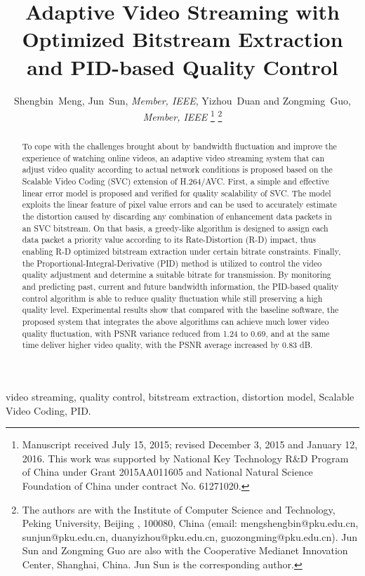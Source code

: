 \documentclass[journal]{IEEEtran}
\title{Adaptive Video Streaming with Optimized Bitstream Extraction and PID-based Quality Control}
\author{Shengbin~Meng, Jun~Sun, {\em Member, IEEE}, Yizhou~Duan and Zongming~Guo, {\em Member, IEEE} %
\thanks{Manuscript received July 15, 2015; revised December 3, 2015 and January 12, 2016. This work was supported by  National Key Technology R\&D Program of China under Grant 2015AA011605 and National Natural Science Foundation of China under contract No. 61271020.}
\thanks{The authors are with the Institute of Computer Science and Technology, Peking University, Beijing%
, 100080, China (email: mengshengbin@pku.edu.cn, sunjun@pku.edu.cn, duanyizhou@pku.edu.cn, guozongming@pku.edu.cn). Jun Sun and Zongming Guo are also with the Cooperative Medianet Innovation Center, Shanghai, China. Jun Sun is the corresponding author.}}
\begin{document}



\maketitle

\begin{abstract}
To cope with the challenges brought about by bandwidth fluctuation and improve the experience of watching online videos, an adaptive video streaming system that can adjust video quality according to actual network conditions is proposed based on the Scalable Video Coding (SVC) extension of H.264/AVC. First, a simple and effective linear error model is proposed and verified for quality scalability of SVC. The model exploits the linear feature of pixel value errors and can be used to accurately estimate the distortion caused by discarding any combination of enhancement data packets in an SVC bitstream. On that basis, a greedy-like algorithm is designed to assign each data packet a priority value according to its Rate-Distortion (R-D) impact, thus enabling R-D optimized bitstream extraction under certain bitrate constraints. Finally, the Proportional-Integral-Derivative (PID) method is utilized to control the video quality adjustment and determine a suitable bitrate for transmission. By monitoring and predicting past, current and future bandwidth information, the PID-based quality control algorithm is able to reduce quality fluctuation while still preserving a high quality level. Experimental results show that compared with the baseline software, the proposed system that integrates the above algorithms can achieve much lower video quality fluctuation, with PSNR variance reduced from 1.24 to 0.69, and at the same time deliver higher video quality, with the PSNR average increased by 0.83 dB.
\end{abstract}

\begin{IEEEkeywords}
video streaming, quality control, bitstream extraction, distortion model, Scalable Video Coding, PID.
\end{IEEEkeywords}



%
\IEEEpeerreviewmaketitle
\end{document}
